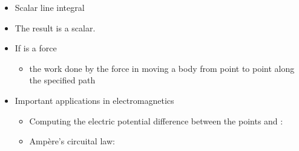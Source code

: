 \begin{ELunit}

\begin{itemize}
\tightlist
\item
  Scalar line integral
\end{itemize}


\begin{itemize}
\tightlist
\item
  The result is a scalar.
\item
  If  is a force

  \begin{itemize}
  \tightlist
  \item
    the work done by the force in moving a body from point  to point  along the specified path 
  \end{itemize}
\item
  Important applications in electromagnetics

  \begin{itemize}
  \item
    Computing the electric potential difference between the points  and :
  \item
    Ampère's circuital law:
  \end{itemize}
\end{itemize}

\end{ELunit}


